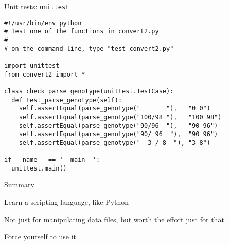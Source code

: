 \documentclass[12pt,t]{beamer}
\begin{document}
\begin{frame}[fragile]{Unit tests: {\tt unittest}}

\vspace{18pt}

\begin{lstlisting}
#!/usr/bin/env python
# Test one of the functions in convert2.py
#
# on the command line, type "test_convert2.py"

import unittest
from convert2 import *

class check_parse_genotype(unittest.TestCase):
  def test_parse_genotype(self):
    self.assertEqual(parse_genotype("       "),   "0 0")
    self.assertEqual(parse_genotype("100/98 "),   "100 98")
    self.assertEqual(parse_genotype("90/96  "),   "90 96")
    self.assertEqual(parse_genotype("90/ 96  "),  "90 96")
    self.assertEqual(parse_genotype("  3 / 8  "), "3 8")

if __name__ == '__main__':
  unittest.main()
\end{lstlisting}

\end{frame}





\begin{frame}{Summary}

\bbi
\item Learn a scripting language, like Python
  \bi
  \item Not just for manipulating data files, but worth the effort
    just for that.
  \ei
\item Force yourself to use it
\ei

\end{frame}
\end{document}
